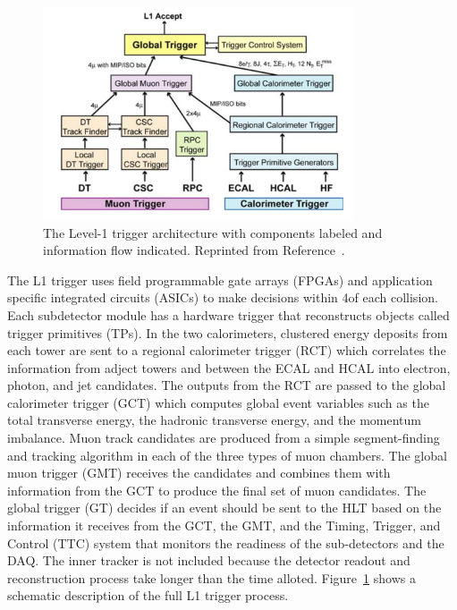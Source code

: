 \begin{figure}[htbp]
  \centering
  \includegraphics[width=0.8175\textwidth]{Detector/Figures/cms_l1t.png}
  \caption{
    The Level-1 trigger architecture with components labeled and information flow indicated.  
    Reprinted from Reference~\cite{CMS2008}.
  }
  \label{fig:cms_l1t}
\end{figure}

The L1 trigger uses field programmable gate arrays (FPGAs) and application specific integrated circuits (ASICs) to make decisions within 4\mus of each collision.
Each subdetector module has a hardware trigger that reconstructs objects called trigger primitives (TPs).
In the two calorimeters, clustered energy deposits from each tower are sent to a regional calorimeter trigger (RCT) which correlates the information from adject towers and between the ECAL and HCAL into electron, photon, and jet candidates.
The outputs from the RCT are passed to the global calorimeter trigger (GCT) which computes global event variables such as the total transverse energy, the hadronic transverse energy, and the momentum imbalance.
Muon track candidates are produced from a simple segment-finding and tracking algorithm in each of the three types of muon chambers.
The global muon trigger (GMT) receives the candidates and combines them with information from the GCT to produce the final set of muon candidates.
The global trigger (GT) decides if an event should be sent to the HLT based on the information it receives from the GCT, the GMT, and the Timing, Trigger, and Control (TTC) system that monitors the readiness of the sub-detectors and the DAQ.
The inner tracker is not included because the detector readout and reconstruction process take longer than the time alloted.
Figure~\ref{fig:cms_l1t} shows a schematic description of the full L1 trigger process.

